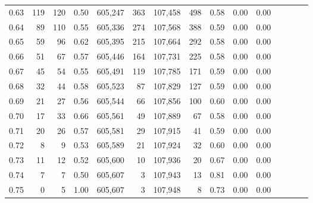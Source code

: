 \begin{tabular}{rrrcrrrrrrrrrrr}
0.63 &     119 &    120 &                                       0.50 &  605,247 &      363 &  107,458 &      498 &  0.58 &  0.00 &                         0.00 \\
0.64 &      89 &    110 &                                       0.55 &  605,336 &      274 &  107,568 &      388 &  0.59 &  0.00 &                         0.00 \\
0.65 &      59 &     96 &                                       0.62 &  605,395 &      215 &  107,664 &      292 &  0.58 &  0.00 &                         0.00 \\
0.66 &      51 &     67 &                                       0.57 &  605,446 &      164 &  107,731 &      225 &  0.58 &  0.00 &                         0.00 \\
0.67 &      45 &     54 &                                       0.55 &  605,491 &      119 &  107,785 &      171 &  0.59 &  0.00 &                         0.00 \\
0.68 &      32 &     44 &                                       0.58 &  605,523 &       87 &  107,829 &      127 &  0.59 &  0.00 &                         0.00 \\
0.69 &      21 &     27 &                                       0.56 &  605,544 &       66 &  107,856 &      100 &  0.60 &  0.00 &                         0.00 \\
0.70 &      17 &     33 &                                       0.66 &  605,561 &       49 &  107,889 &       67 &  0.58 &  0.00 &                         0.00 \\
0.71 &      20 &     26 &                                       0.57 &  605,581 &       29 &  107,915 &       41 &  0.59 &  0.00 &                         0.00 \\
0.72 &       8 &      9 &                                       0.53 &  605,589 &       21 &  107,924 &       32 &  0.60 &  0.00 &                         0.00 \\
0.73 &      11 &     12 &                                       0.52 &  605,600 &       10 &  107,936 &       20 &  0.67 &  0.00 &                         0.00 \\
0.74 &       7 &      7 &                                       0.50 &  605,607 &        3 &  107,943 &       13 &  0.81 &  0.00 &                         0.00 \\
0.75 &       0 &      5 &                                       1.00 &  605,607 &        3 &  107,948 &        8 &  0.73 &  0.00 &                         0.00 \\

\end{tabular}
